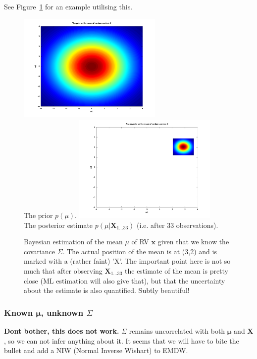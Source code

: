 See Figure~\ref{fig:bayesmeanest2d} for an example utilising this.

\begin{figure}
\includegraphics[width=7cm]{prior_of_mean}\\
The prior $p(\mu)$.
\includegraphics[width=7cm]{posterior_of_mean}\\
The posterior estimate $p(\mu|\mathbf{X}_{1\ldots33})$ (i.e. after
33 observations).
\caption{Bayesian estimation of the mean $\mu$ of RV $\mathbf{x}$ given that
we know the covariance $\Sigma$. The actual position of the mean
is at (3,2) and is marked with a (rather faint) 'X'. The important
point here is not so much that after observing $\mathbf{X}_{1\ldots33}$
the estimate of the mean is pretty close (ML estimation will also
give that), but that the uncertainty about the estimate is also quantified.
Subtly beautiful!}
\label{fig:bayesmeanest2d}
\end{figure}



\subsubsection{Known $\mathbf{\mu}$, unknown $\Sigma$}

\textbf{Dont bother, this does not work.} $\Sigma$ remains uncorrelated
with both $\mathbf{\mu}$ and $\mathbf{X}$, so we can not infer anything
about it. It seems that we will have to bite the bullet and add a
NIW (Normal Inverse Wishart) to EMDW.

